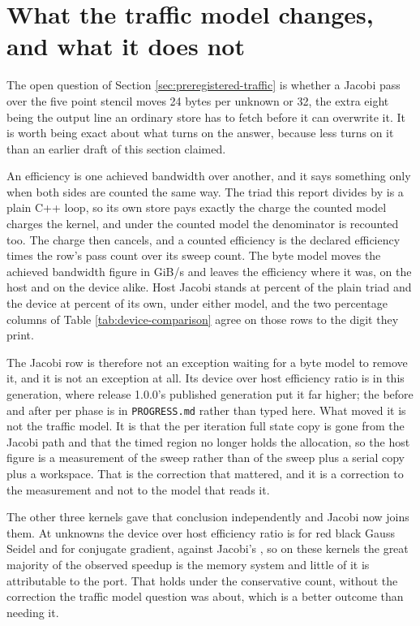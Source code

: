 \section{What the traffic model changes, and what it does not}
\label{sec:traffic-correction}

The open question of Section \ref{sec:preregistered-traffic} is whether a Jacobi
pass over the five point stencil moves 24 bytes per unknown or 32, the extra
eight being the output line an ordinary store has to fetch before it can
overwrite it. It is worth being exact about what turns on the answer, because
less turns on it than an earlier draft of this section claimed.

An efficiency is one achieved bandwidth over another, and it says something only
when both sides are counted the same way. The triad this report divides by is a
plain C++ loop, so its own store pays exactly the charge the counted model
charges the kernel, and under the counted model the denominator is recounted
too. The charge then cancels, and a counted efficiency is the declared
efficiency times the row's pass count over its sweep count. The byte model moves
the achieved bandwidth figure in GiB/s and leaves the efficiency where it was,
on the host and on the device alike. Host Jacobi stands at
\pnlJacobiHostEfficiency{} percent of the plain triad and the device at
\pnlJacobiDeviceEfficiency{} percent of its own, under either model, and the two
percentage columns of Table \ref{tab:device-comparison} agree on those rows to
the digit they print.

The Jacobi row is therefore not an exception waiting for a byte model to remove
it, and it is not an exception at all. Its device over host efficiency ratio is
\pnlJacobiEfficiencyRatio{} in this generation, where release 1.0.0's published
generation put it far higher; the before and after per phase is in
\texttt{PROGRESS.md} rather than typed here. What moved it is not the traffic
model. It is that the per iteration full state copy is gone from the Jacobi path
and that the timed region no longer holds the allocation, so the host figure is
a measurement of the sweep rather than of the sweep plus a serial copy plus a
workspace. That is the correction that mattered, and it is a correction to the
measurement and not to the model that reads it.

The other three kernels gave that conclusion independently and Jacobi now joins
them. At \pnlDeviceSize{} unknowns the device over host efficiency ratio is
\pnlRedBlackEfficiencyRatio{} for red black Gauss Seidel and
\pnlCgEfficiencyRatio{} for conjugate gradient, against Jacobi's
\pnlJacobiEfficiencyRatio{}, so on these kernels the great majority of the
observed speedup is the memory system and little of it is attributable to the
port. That holds under the conservative count, without the correction the
traffic model question was about, which is a better outcome than needing it.

